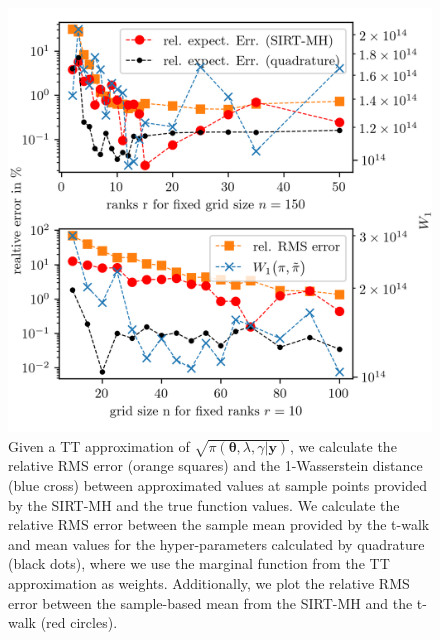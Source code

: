 \begin{figure}[ht!]
	\centering%
	\includegraphics[]{findGridRank.png}
	\caption[Optimal rank and number of grid points for TT approximation.]{Given a TT approximation of $\sqrt{\pi( \bm{\theta},\lambda,\gamma  | \bm{y}) }$, we calculate the relative RMS error (orange squares) and the 1-Wasserstein distance (blue cross) between approximated values at sample points provided by the SIRT-MH and the true function values. We calculate the relative RMS error between the sample mean provided by the t-walk and mean values for the hyper-parameters calculated by quadrature (black dots), where we use the marginal function from the TT approximation as weights. Additionally, we plot the relative RMS error between the sample-based mean from the SIRT-MH and the t-walk (red circles).}
	\label{fig:FindRankGrid}
\end{figure}

